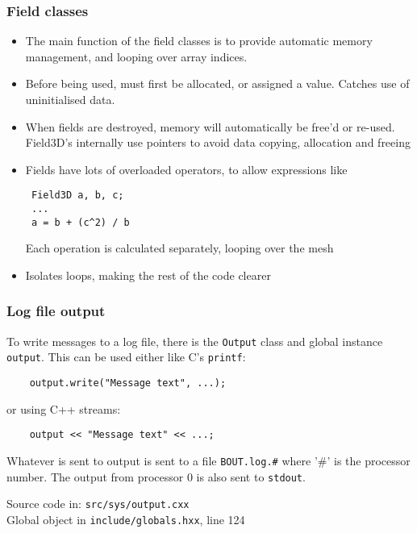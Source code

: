 \documentclass{beamer}
\begin{document}
\begin{frame}[fragile]
  \frametitle{Field classes}
  \begin{itemize}
  \item The main function of the field classes is to provide
    automatic memory management, and looping over array indices.
  \item Before being used, must first be allocated, or assigned a value.
    Catches use of uninitialised data.
  \item When fields are destroyed, memory will automatically be free'd or
    re-used. Field3D's internally use pointers to avoid data copying,
    allocation and freeing
    \pause
  \item Fields have lots of overloaded operators, to allow expressions like
    \begin{verbatim}
 Field3D a, b, c;
 ...
 a = b + (c^2) / b
    \end{verbatim}
    \vspace{-0.5cm}
    Each operation is calculated separately, looping over the mesh
  \item Isolates loops, making the rest of the code clearer
  \end{itemize}
\end{frame}

\begin{frame}[fragile]
  \frametitle{Log file output}
  
  To write messages to a log file, there is the \texttt{Output} class
  and global instance \texttt{output}. This can be used either like
  C's \texttt{printf}:
  \begin{verbatim}
    output.write("Message text", ...);
  \end{verbatim}
  \vspace{-0.5cm}
  or using C++ streams:
  \begin{verbatim}
    output << "Message text" << ...;
  \end{verbatim}
  \vspace{-0.5cm}
  
  Whatever is sent to output is sent to a file \texttt{BOUT.log.\#} where '\#' is the processor number. The output from processor 0 is also sent to \texttt{stdout}.
  
  \begin{block}
    
    \begin{center}
      Source code in: \texttt{src/sys/output.cxx} \\
      Global object in \texttt{include/globals.hxx}, line 124
    \end{center}
  \end{block}
\end{frame}
\end{document}
